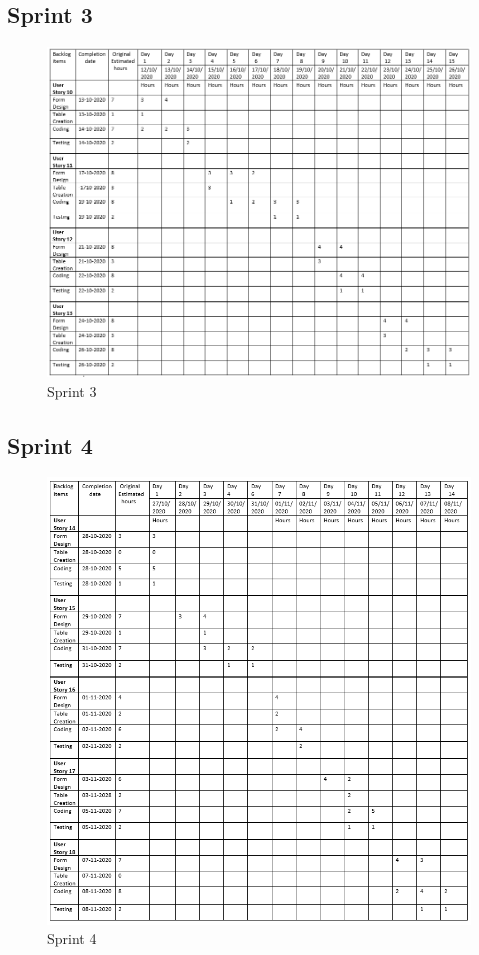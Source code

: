 \documentclass[a4paper,12pt]{report}
\begin{document}
\subsection {Sprint 3}
\begin{figure}[bph]
	\centering
	\includegraphics[width=1\linewidth]{img/sprint/sp3p}
	\caption{Sprint 3}
\end{figure}
\pagebreak
\subsection {Sprint 4}
\begin{figure}[bph]
	\centering
	\includegraphics[width=0.9\linewidth]{img/sprint/sp4p}
	\caption{Sprint 4}
\end{figure}
\pagebreak
\end{document}
